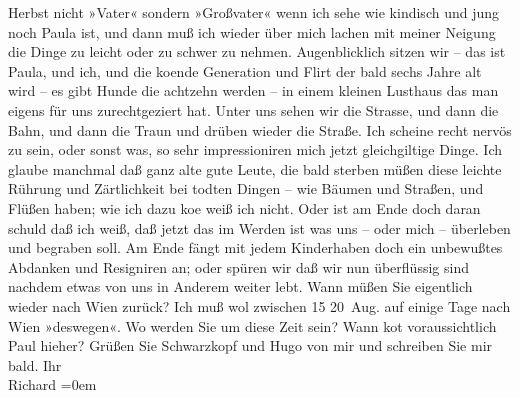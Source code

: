 \begin{ledgroupsized}[t]{13cm}
               Herbst nicht »Vater« sondern »Großvater« wenn ich sehe wie kindisch und jung noch Paula ist, und dann muß ich wieder {\pb}über mich lachen mit meiner Neigung
               die Dinge zu leicht oder zu schwer zu nehmen. Augenblicklich sitzen wir – das ist Paula, und ich, und die ko{\geminationm}ende
                  Generation und Flirt der bald sechs Jahre {\pb}alt wird – es gibt Hunde die
               achtzehn werden – in einem kleinen Lusthaus das man eigens für uns zurechtgezi{\geminationm}ert hat. Unter uns sehen wir die Strasse, und dann die
               Bahn, und dann die Traun und drüben wieder die
               Straße.\pend
           \pstart
           Ich scheine recht nervös {\pb}zu sein,
               oder sonst was, so sehr impressioniren mich jetzt gleichgiltige Dinge. Ich glaube
               manchmal daß ganz alte gute Leute, die bald sterben müßen diese leichte Rührung und
               Zärtlichkeit bei todten Dingen – wie Bäumen und {\pb}Straßen, und Flüßen haben; wie ich
               dazu ko{\geminationm}e weiß ich nicht. Oder ist am Ende doch daran
               schuld daß ich weiß, daß jetzt das im Werden ist was uns – oder mich – überleben und
               begraben soll. {\pb}Am Ende fängt mit
               jedem Kinderhaben doch ein unbewußtes Abdanken und Resigniren an; oder spüren wir daß
               wir nun überflüssig sind nachdem etwas von uns in {\pb}Anderem weiter lebt.\pend
           \pstart
           Wann müßen Sie eigentlich wieder nach Wien zurück?
               Ich muß wol zwischen 15{ }{\kaufmannsund}{ }20 Aug. auf einige Tage nach Wien
               »deswegen«. Wo werden Sie um diese Zeit sein? Wann ko{\geminationm}t
               voraussichtlich Paul hieher? Grüßen {\pb}Sie Schwarzkopf und Hugo von mir und schreiben Sie mir bald.\pend
           \pstart
           Ihr{\\[\baselineskip]}\spacefill\mbox{Richard}\pend
           \leftskip=0em{}
         
         \endnumbering{}\end{ledgroupsized}  \newcommand{\dateiname}{L00686}\newcommand{\titel}{Richard Beer-Hofmann an Arthur Schnitzler, 13. 6. 1897}\newcommand{\editorInnen}{Martin Anton Müller und Gerd-Hermann Susen}
      